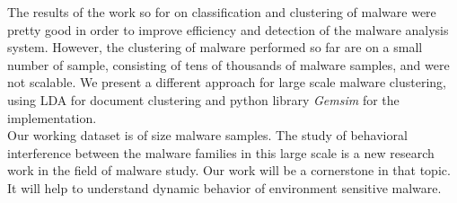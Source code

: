 The results of the work so for on classification and clustering of malware were pretty good in order to improve efficiency and detection of the malware analysis system.
However, the clustering of malware performed so far are on a small number of sample, consisting of tens of thousands of malware samples, and were not scalable.
We present a different approach for large scale malware clustering, using LDA for document clustering and python library \emph{Gemsim} for the implementation.\\
Our working dataset is of size {\gettotalmalwarei{}} malware samples.
The study of behavioral interference between the malware families in this large scale is a new research work in the field of malware study.
Our work will be a cornerstone in that topic.
It will help to understand dynamic behavior of environment sensitive malware.
